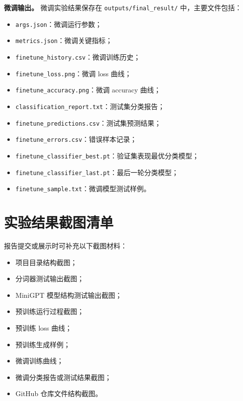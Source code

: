 \documentclass[UTF8,a4paper,zihao=-4,fontset=none]{ctexart}
\numberwithin{equation}{section}
\begin{document}
\textbf{微调输出。} 微调实验结果保存在 \texttt{outputs/final\_result/} 中，主要文件包括：
\begin{itemize}
  \item \texttt{args.json}：微调运行参数；
  \item \texttt{metrics.json}：微调关键指标；
  \item \texttt{finetune\_history.csv}：微调训练历史；
  \item \texttt{finetune\_loss.png}：微调 loss 曲线；
  \item \texttt{finetune\_accuracy.png}：微调 accuracy 曲线；
  \item \texttt{classification\_report.txt}：测试集分类报告；
  \item \texttt{finetune\_predictions.csv}：测试集预测结果；
  \item \texttt{finetune\_errors.csv}：错误样本记录；
  \item \texttt{finetune\_classifier\_best.pt}：验证集表现最优分类模型；
  \item \texttt{finetune\_classifier\_last.pt}：最后一轮分类模型；
  \item \texttt{finetune\_sample.txt}：微调模型测试样例。
\end{itemize}

\section{实验结果截图清单}

报告提交或展示时可补充以下截图材料：
\begin{itemize}
  \item 项目目录结构截图；
  \item 分词器测试输出截图；
  \item MiniGPT 模型结构测试输出截图；
  \item 预训练运行过程截图；
  \item 预训练 loss 曲线；
  \item 预训练生成样例；
  \item 微调训练曲线；
  \item 微调分类报告或测试结果截图；
  \item GitHub 仓库文件结构截图。
\end{itemize}
\end{document}
